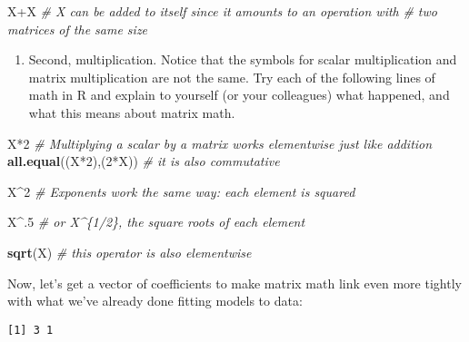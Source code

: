 \documentclass[10pt,]{article}
\newenvironment{Shaded}{\begin{snugshade}}{\end{snugshade}}
\newcommand{\KeywordTok}[1]{\textcolor[rgb]{0.13,0.29,0.53}{\textbf{{#1}}}}
\newcommand{\DecValTok}[1]{\textcolor[rgb]{0.00,0.00,0.81}{{#1}}}
\newcommand{\StringTok}[1]{\textcolor[rgb]{0.31,0.60,0.02}{{#1}}}
\newcommand{\CommentTok}[1]{\textcolor[rgb]{0.56,0.35,0.01}{\textit{{#1}}}}
\newcommand{\NormalTok}[1]{{#1}}
\providecommand{\tightlist}{%
  \setlength{\itemsep}{0pt}\setlength{\parskip}{0pt}}
\begin{document}
\begin{Shaded}
\begin{Highlighting}[]
\NormalTok{X+X}
\CommentTok{# X can be added to itself since it amounts to an operation with}
\CommentTok{# two matrices of the same size}
\end{Highlighting}
\end{Shaded}

\begin{enumerate}
\def\labelenumi{\arabic{enumi}.}
\setcounter{enumi}{2}
\tightlist
\item
  Second, multiplication. Notice that the symbols for scalar
  multiplication and matrix multiplication are not the same. Try each of
  the following lines of math in R and explain to yourself (or your
  colleagues) what happened, and what this means about matrix math.
\end{enumerate}

\begin{Shaded}
\begin{Highlighting}[]
\NormalTok{X*}\DecValTok{2}  \CommentTok{# Multiplying a scalar by a matrix works elementwise just like addition}
\KeywordTok{all.equal}\NormalTok{((X*}\DecValTok{2}\NormalTok{),(}\DecValTok{2}\NormalTok{*X))  }\CommentTok{# it is also commutative}

\NormalTok{X^}\DecValTok{2}  \CommentTok{# Exponents work the same way: each element is squared}

\NormalTok{X^.}\DecValTok{5}  \CommentTok{# or X^\{1/2\}, the square roots of each element}

\KeywordTok{sqrt}\NormalTok{(X)  }\CommentTok{# this operator is also elementwise}
\end{Highlighting}
\end{Shaded}

Now, let's get a vector of coefficients to make matrix math link even
more tightly with what we've already done fitting models to data:

\begin{Shaded}
\end{Shaded}

\begin{verbatim}
[1] 3 1
\end{verbatim}
\end{document}
